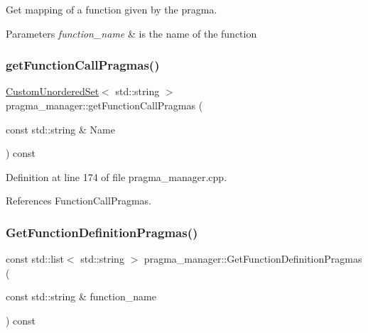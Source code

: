 Get mapping of a function given by the pragma. 


\begin{DoxyParams}{Parameters}
{\em function\+\_\+name} & is the name of the function \\
\hline
\end{DoxyParams}
\mbox{\label{classpragma__manager_a93a79077c0e60688b26c36fc10858d58}} 
\subsubsection{\texorpdfstring{get\+Function\+Call\+Pragmas()}{getFunctionCallPragmas()}}
{\footnotesize\ttfamily \hyperlink{classCustomUnorderedSet}{Custom\+Unordered\+Set}$<$ std\+::string $>$ pragma\+\_\+manager\+::get\+Function\+Call\+Pragmas (\begin{DoxyParamCaption}\item[{const std\+::string \&}]{Name }\end{DoxyParamCaption}) const}



Definition at line 174 of file pragma\+\_\+manager.\+cpp.



References Function\+Call\+Pragmas.

\mbox{\label{classpragma__manager_a0ee0e0a92fc87d1b02138648e6772c2c}} 
\subsubsection{\texorpdfstring{Get\+Function\+Definition\+Pragmas()}{GetFunctionDefinitionPragmas()}}
{\footnotesize\ttfamily const std\+::list$<$ std\+::string $>$ pragma\+\_\+manager\+::\+Get\+Function\+Definition\+Pragmas (\begin{DoxyParamCaption}\item[{const std\+::string \&}]{function\+\_\+name }\end{DoxyParamCaption}) const}



